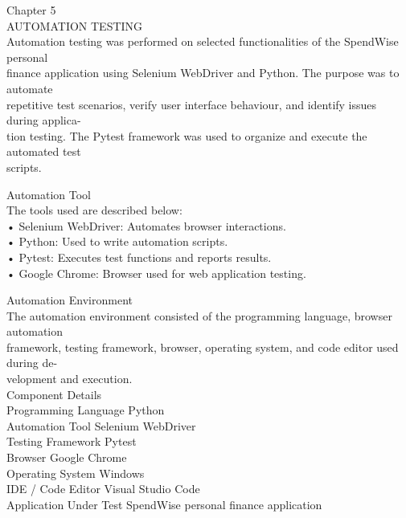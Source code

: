 \documentclass[12pt,a4paper]{report}
\begin{document}
\smallskip

\smallskip
Chapter 5\\ 

\smallskip
AUTOMATION TESTING\\ 

\smallskip
Automation testing was performed on selected functionalities of the SpendWise personal\\ 
finance application using Selenium WebDriver and Python. The purpose was to automate\\ 
repetitive test scenarios, verify user interface behaviour, and identify issues during applica-\\ 
tion testing. The Pytest framework was used to organize and execute the automated test\\ 
scripts.\\ 

\smallskip

 Automation Tool\\ 

\smallskip
The tools used are described below:\\ 

\smallskip
• Selenium WebDriver: Automates browser interactions.\\ 

\smallskip
• Python: Used to write automation scripts.\\ 

\smallskip
• Pytest: Executes test functions and reports results.\\ 

\smallskip
• Google Chrome: Browser used for web application testing.\\ 

\smallskip

 Automation Environment\\ 

\smallskip
The automation environment consisted of the programming language, browser automation\\ 
framework, testing framework, browser, operating system, and code editor used during de-\\ 
velopment and execution.\\ 

\smallskip
Component                          Details\\ 
Programming Language               Python\\ 
Automation Tool                    Selenium WebDriver\\ 
Testing Framework                  Pytest\\ 
Browser                            Google Chrome\\ 
Operating System                   Windows\\ 
IDE / Code Editor                  Visual Studio Code\\ 
Application Under Test             SpendWise personal finance application\\ 
\end{document}
